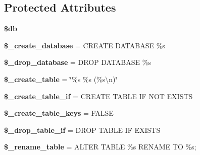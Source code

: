 \subsection*{Protected Attributes}
\begin{DoxyCompactItemize}
\item 
\mbox{\label{class_c_i___d_b__forge_ade28691b7982e554bc59266f6b2b84c7}} 
{\bfseries \$db}
\item 
\mbox{\label{class_c_i___d_b__forge_aabc343846e8884e2e7edce141095cdb5}} 
{\bfseries \$\+\_\+create\+\_\+database} = \textquotesingle{}C\+R\+E\+A\+TE D\+A\+T\+A\+B\+A\+SE \%s\textquotesingle{}
\item 
\mbox{\label{class_c_i___d_b__forge_afc3320f82ec77912a68d5daaa2fa6942}} 
{\bfseries \$\+\_\+drop\+\_\+database} = \textquotesingle{}D\+R\+OP D\+A\+T\+A\+B\+A\+SE \%s\textquotesingle{}
\item 
\mbox{\label{class_c_i___d_b__forge_aae62084ce08f1effe584b13acb2f739b}} 
{\bfseries \$\+\_\+create\+\_\+table} = \char`\"{}\%s \%s (\%s\textbackslash{}n)\char`\"{}
\item 
\mbox{\label{class_c_i___d_b__forge_a8220f5f6df00c2c13f9090d200ff1a92}} 
{\bfseries \$\+\_\+create\+\_\+table\+\_\+if} = \textquotesingle{}C\+R\+E\+A\+TE T\+A\+B\+LE IF N\+OT E\+X\+I\+S\+TS\textquotesingle{}
\item 
\mbox{\label{class_c_i___d_b__forge_ab57d81ebd22306b14db8e02551274bd7}} 
{\bfseries \$\+\_\+create\+\_\+table\+\_\+keys} = F\+A\+L\+SE
\item 
\mbox{\label{class_c_i___d_b__forge_a5e4bb98e78486ae05e1f7544f9f5e543}} 
{\bfseries \$\+\_\+drop\+\_\+table\+\_\+if} = \textquotesingle{}D\+R\+OP T\+A\+B\+LE IF E\+X\+I\+S\+TS\textquotesingle{}
\item 
\mbox{\label{class_c_i___d_b__forge_afc72a90463341926435b7c53c8791aa8}} 
{\bfseries \$\+\_\+rename\+\_\+table} = \textquotesingle{}A\+L\+T\+ER T\+A\+B\+LE \%s R\+E\+N\+A\+ME TO \%s;\textquotesingle{}
\item 

\end{DoxyCompactItemize}
